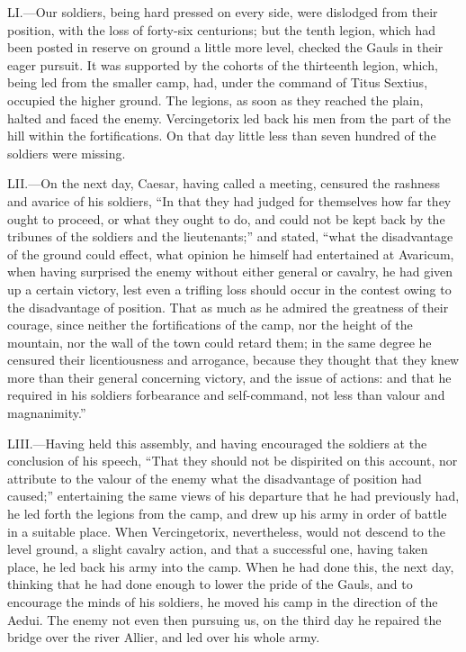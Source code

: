 LI.—Our soldiers, being hard pressed on every side, were dislodged from
their position, with the loss of forty-six centurions; but the tenth
legion, which had been posted in reserve on ground a little more level,
checked the Gauls in their eager pursuit. It was supported by the
cohorts of the thirteenth legion, which, being led from the smaller
camp, had, under the command of Titus Sextius, occupied the higher
ground. The legions, as soon as they reached the plain, halted and faced
the enemy. Vercingetorix led back his men from the part of the hill
within the fortifications. On that day little less than seven hundred of
the soldiers were missing.

LII.—On the next day, Caesar, having called a meeting, censured the
rashness and avarice of his soldiers, ``In that they had judged for
themselves how far they ought to proceed, or what they ought to do, and
could not be kept back by the tribunes of the soldiers and the
lieutenants;'' and stated, ``what the disadvantage of the ground could
effect, what opinion he himself had entertained at Avaricum, when having
surprised the enemy without either general or cavalry, he had given up a
certain victory, lest even a trifling loss should occur in the contest
owing to the disadvantage of position. That as much as he admired the
greatness of their courage, since neither the fortifications of the
camp, nor the height of the mountain, nor the wall of the town could
retard them; in the same degree he censured their licentiousness and
arrogance, because they thought that they knew more than their general
concerning victory, and the issue of actions: and that he required in
his soldiers forbearance and self-command, not less than valour and
magnanimity.''

LIII.—Having held this assembly, and having encouraged the soldiers at
the conclusion of his speech, ``That they should not be dispirited on
this account, nor attribute to the valour of the enemy what the
disadvantage of position had caused;'' entertaining the same views of his
departure that he had previously had, he led forth the legions from the
camp, and drew up his army in order of battle in a suitable place. When
Vercingetorix, nevertheless, would not descend to the level ground, a
slight cavalry action, and that a successful one, having taken place, he
led back his army into the camp. When he had done this, the next day,
thinking that he had done enough to lower the pride of the Gauls, and to
encourage the minds of his soldiers, he moved his camp in the direction
of the Aedui. The enemy not even then pursuing us, on the third day he
repaired the bridge over the river Allier, and led over his whole army.

